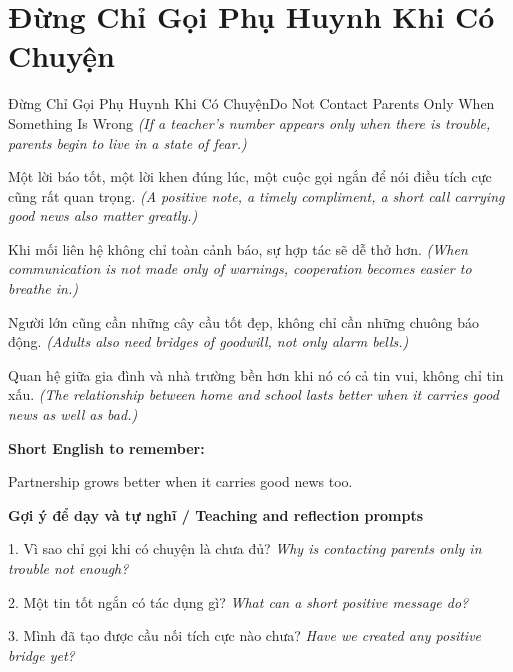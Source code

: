 \section{Đừng Chỉ Gọi Phụ Huynh Khi Có Chuyện}
\begin{truyen}{Đừng Chỉ Gọi Phụ Huynh Khi Có Chuyện}{Do Not Contact Parents Only When Something Is Wrong}
\textit{(If a teacher’s number appears only when there is trouble, parents begin to live in a state of fear.)}

Một lời báo tốt, một lời khen đúng lúc, một cuộc gọi ngắn để nói điều tích cực cũng rất quan trọng.
\textit{(A positive note, a timely compliment, a short call carrying good news also matter greatly.)}

Khi mối liên hệ không chỉ toàn cảnh báo, sự hợp tác sẽ dễ thở hơn.
\textit{(When communication is not made only of warnings, cooperation becomes easier to breathe in.)}

Người lớn cũng cần những cây cầu tốt đẹp, không chỉ cần những chuông báo động.
\textit{(Adults also need bridges of goodwill, not only alarm bells.)}

\end{truyen}

\begin{baihoc}
Quan hệ giữa gia đình và nhà trường bền hơn khi nó có cả tin vui, không chỉ tin xấu.
\textit{(The relationship between home and school lasts better when it carries good news as well as bad.)}
\end{baihoc}

\begin{ghinhoanh}
\textbf{Short English to remember:}

Partnership grows better when it carries good news too.

\end{ghinhoanh}

\begin{tuhocnhanh}
\textbf{Gợi ý để dạy và tự nghĩ / Teaching and reflection prompts}

1. Vì sao chỉ gọi khi có chuyện là chưa đủ? \textit{Why is contacting parents only in trouble not enough?}

2. Một tin tốt ngắn có tác dụng gì? \textit{What can a short positive message do?}

3. Mình đã tạo được cầu nối tích cực nào chưa? \textit{Have we created any positive bridge yet?}
\end{tuhocnhanh}
\ngancach

